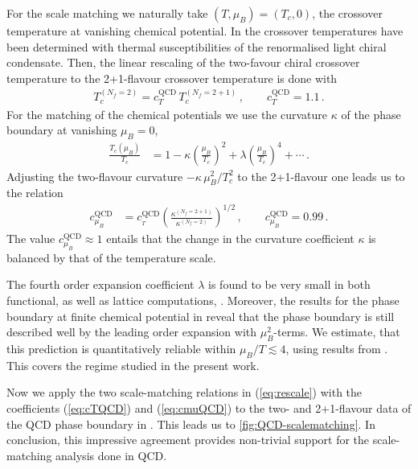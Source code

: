 \documentclass[%
reprint,
superscriptaddress,
showpacs,preprintnumbers,
amsmath,amssymb,
aps,
prd,
]{revtex4-1}
\def\eq#1{(\ref{#1})}
\begin{document}
For the scale matching we naturally take $(T,\mu_B)=(T_c,0)$, the crossover temperature at vanishing chemical potential. In \cite{Fu:2019hdw} the crossover temperatures have been determined with thermal susceptibilities of the renormalised light chiral condensate. Then, the linear rescaling of the two-favour chiral crossover temperature to the 2+1-flavour crossover temperature is done with 
%
\begin{align}\label{eq:cTQCD}
T_c^{(N_f=2)} = c_T^{\textrm{QCD}}\, T_c^{(N_f=2+1)}\,, \qquad  c_T^{\textrm{QCD}}=1.1\,. 
\end{align} 
%
For the matching of the chemical potentials we use the curvature $\kappa$ of the phase boundary at vanishing $\mu_B=0$, 
%
\begin{align}
\frac{T_c(\mu_B)}{T_c}&=1-\kappa \left(\frac{\mu_B}{T_c}\right)^2+\lambda \left(\frac{\mu_B}{T_c}\right)^4+\cdots\,.\label{eq:curv}
\end{align}
% 
Adjusting the two-flavour curvature $-\kappa\, \mu_B^2/T_c^2$ to the 2+1-flavour one leads us to the relation 
%
\begin{align}
c^\textrm{QCD}_{\mu_B}&=c^{\textrm{QCD}}_{_{T}}\left(\frac{\kappa^{(N_f=2+1)}}{\kappa^{(N_f=2)}}\right)^{1/2}\,, \qquad c_{\mu_B}^\textrm{QCD}=0.99 \,.\label{eq:cmuQCD}
\end{align}
%
The value $c_{\mu_B}^\textrm{QCD}\approx 1$ entails that the change in the curvature coefficient $\kappa$ is balanced by that of the temperature scale.  

The fourth order expansion coefficient $\lambda$ is found to be very small in both functional, \cite{Fu:2019hdw, Gao:2020fbl, Gao:2020qsj} as well as lattice computations, \cite{Bazavov:2018mes,Borsanyi:2020fev}. Moreover, the results for the phase boundary at finite chemical potential in \cite{Fu:2019hdw, Gao:2020fbl, Gao:2020qsj, Fischer:2018sdj} reveal that the phase boundary is still described well by the leading  order expansion with $\mu_B^2$-terms. We estimate, that this prediction is quantitatively reliable within $\mu_B/T\lesssim 4$, using results from \cite{Fu:2019hdw, Gao:2020fbl, Gao:2020qsj, Fischer:2018sdj, Braun:2019aow}. This covers the regime studied in the present work. 

Now we apply the two scale-matching relations in \eq{eq:rescale} with the coefficients \eq{eq:cTQCD} and \eq{eq:cmuQCD} to the two- and 2+1-flavour data of the QCD phase boundary in \cite{Fu:2019hdw}. This leads us to \autoref{fig:QCD-scalematching}. In conclusion, this impressive agreement provides non-trivial support for the scale-matching analysis done in QCD. 
\end{document}
